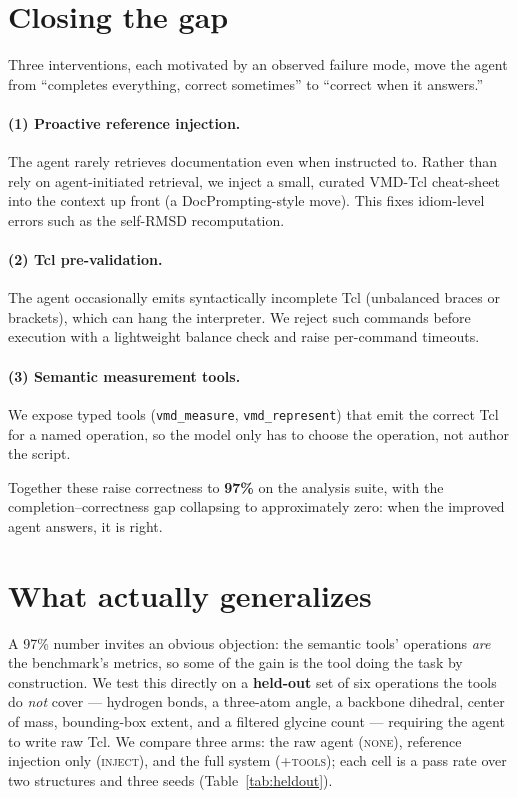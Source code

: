 \documentclass[11pt]{article}
\begin{document}
\section{Closing the gap}
Three interventions, each motivated by an observed failure mode, move the agent from
``completes everything, correct sometimes'' to ``correct when it answers.''

\paragraph{(1) Proactive reference injection.} The agent rarely retrieves documentation even
when instructed to. Rather than rely on agent-initiated retrieval, we inject a small, curated
VMD-Tcl cheat-sheet into the context up front (a DocPrompting-style move). This fixes idiom-level
errors such as the self-RMSD recomputation.

\paragraph{(2) Tcl pre-validation.} The agent occasionally emits syntactically incomplete Tcl
(unbalanced braces or brackets), which can hang the interpreter. We reject such commands before
execution with a lightweight balance check and raise per-command timeouts.

\paragraph{(3) Semantic measurement tools.} We expose typed tools (\texttt{vmd\_measure},
\texttt{vmd\_represent}) that emit the correct Tcl for a named operation, so the model only has to
choose the operation, not author the script.

Together these raise correctness to \textbf{97\%} on the analysis suite, with the
completion--correctness gap collapsing to approximately zero: when the improved agent answers, it
is right.

\section{What actually generalizes}
A 97\% number invites an obvious objection: the semantic tools' operations \emph{are} the
benchmark's metrics, so some of the gain is the tool doing the task by construction. We test this
directly on a \textbf{held-out} set of six operations the tools do \emph{not} cover --- hydrogen
bonds, a three-atom angle, a backbone dihedral, center of mass, bounding-box extent, and a
filtered glycine count --- requiring the agent to write raw Tcl. We compare three arms: the raw
agent (\textsc{none}), reference injection only (\textsc{inject}), and the full system
(\textsc{+tools}); each cell is a pass rate over two structures and three seeds (Table~\ref{tab:heldout}).
\end{document}
